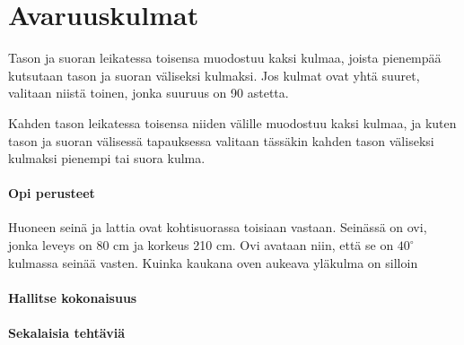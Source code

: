 \section*{Avaruuskulmat}

Tason ja suoran leikatessa toisensa muodostuu kaksi kulmaa, joista pienempää kutsutaan tason ja suoran väliseksi kulmaksi. Jos kulmat ovat yhtä suuret, valitaan niistä toinen, jonka suuruus on 90 astetta. %

Kahden tason leikatessa toisensa niiden välille muodostuu kaksi kulmaa, ja kuten tason ja suoran välisessä tapauksessa valitaan tässäkin kahden tason väliseksi kulmaksi pienempi tai suora kulma.

\begin{tehtavasivu}

\paragraph*{Opi perusteet}

\begin{tehtava}
Huoneen seinä ja lattia ovat kohtisuorassa toisiaan vastaan. Seinässä on ovi, jonka leveys on 80 cm ja korkeus 210 cm. Ovi avataan niin, että se on $40^\circ$ kulmassa seinää vasten.
Kuinka kaukana oven aukeava yläkulma on silloin
\begin{alakohdat}
\end{alakohdat}
\begin{vastaus}
\begin{alakohdat}
\alakohta{}
\alakohta{}
\alakohta{}
\end{alakohdat}
\end{vastaus}
\end{tehtava}

\paragraph*{Hallitse kokonaisuus}

\paragraph*{Sekalaisia tehtäviä}

\end{tehtavasivu}